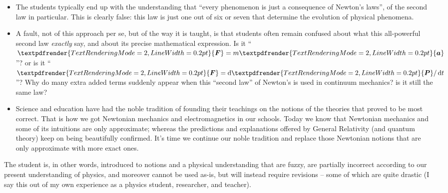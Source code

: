 \documentclass[a4paper,12pt,%
onecolumn,oneside,%
british%
]{memoir}
\renewcommand*{\bm}[1]{\textpdfrender{TextRenderingMode=2,LineWidth=0.2pt}{\boldsymbol{#1}}}
\newcommand*{\di}{\mathop{}\!\mathrm{d}}%
\renewcommand*{\|}[1][]{\nonscript\:#1\vert\nonscript\:\mathopen{}}
\newcommand*{\dt}{\di t}
\begin{document}
\begin{itemize}
\item The students typically end up with the understanding that \enquote{every phenomenon is just a consequence of Newton's laws}, of the second law in particular. This is clearly false: this law is just one out of six or seven that determine the evolution of physical phenomena.

\item A fault, not of this approach per se, but of the way it is taught, is that students often remain confused about what this all-powerful second law \emph{exactly} say, and about its precise mathematical expression. Is it \enquote{$\bm{F}=m\bm{a}$}? or is it \enquote{$\bm{F}=\di\bm{P}/\dt$}? Why do many extra added terms suddenly appear when this \enquote{second law} of Newton's is used in continuum mechanics? is it still the same law?

\item Science and education have had the noble tradition of founding their teachings on the notions of the theories that proved to be most correct. That is how we got Newtonian mechanics and electromagnetics in our schools. Today we know that Newtonian mechanics and some of its intuitions are only approximate; whereas the predictions and explanations offered by General Relativity (and quantum theory) keep on being beautifully confirmed. It's time we continue our noble tradition and replace those Newtonian notions that are only approximate with more exact ones.

\end{itemize}

  The student is, in other words, introduced to notions and a physical understanding that are fuzzy, are partially incorrect according to our present understanding of physics, and moreover cannot be used as-is, but will instead require revisions -- some of which are quite drastic (I say this out of my own experience as a physics student, researcher, and teacher).
\end{document}
